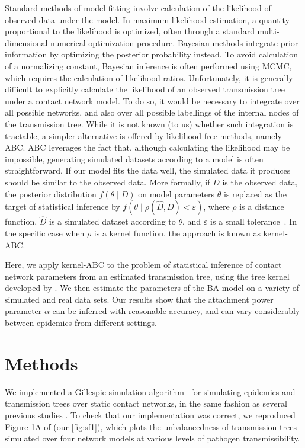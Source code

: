 \documentclass[12pt]{article}\usepackage[]{graphicx}\usepackage[]{color}
\begin{document}
Standard methods of model fitting involve calculation of the likelihood of
observed data under the model. In maximum likelihood estimation, a quantity
proportional to the likelihood is optimized, often through a standard
multi-dimensional numerical optimization procedure. Bayesian methods integrate
prior information by optimizing the posterior probability instead. To avoid
calculation of a normalizing constant, Bayesian inference is often performed
using \gls{MCMC}, which requires the calculation of likelihood ratios.
Unfortunately, it is generally difficult to explicitly calculate the likelihood
of an observed transmission tree under a contact network model. To do so, it
would be necessary to integrate over all possible networks, and also over all
possible labellings of the internal nodes of the transmission tree. While it is
not known (to us) whether such integration is tractable, a simpler alternative
is offered by likelihood-free methods, namely \gls{ABC}. \gls{ABC} leverages
the fact that, although calculating the likelihood may be impossible,
generating simulated datasets according to a model is often straightforward. If
our model fits the data well, the simulated data it produces should be similar
to the observed data. More formally, if $D$ is the observed data, the posterior
distribution $f(\theta \mid D)$ on model parameters $\theta$ is replaced as the
target of statistical inference by $f(\theta \mid \rho(\hat{D}, D) <
\varepsilon)$, where $\rho$ is a distance function, $\hat{D}$ is a simulated
dataset according to $\theta$, and $\varepsilon$ is a small
tolerance~\autocite{sunnaker2013approximate}. In the specific case when $\rho$
is a kernel function, the approach is known as kernel-\gls{ABC}.

Here, we apply kernel-\gls{ABC} to the problem of statistical inference of
contact network parameters from an estimated transmission tree, using the tree
kernel developed by \textcite{poon2013mapping}. We then estimate the parameters
of the \gls{BA} model on a variety of simulated and real data sets. Our results
show that the attachment power parameter $\alpha$ can be inferred with
reasonable accuracy, and can vary considerably between epidemics from different
settings.

\section*{Methods}

We implemented a Gillespie simulation algorithm~\autocite{gillespie1976general}
for simulating epidemics and transmission trees over static contact networks,
in the same fashion as several previous studies
\autocite[\textit{e.g.}][]{o2010contact, robinson2013dynamics,
leventhal2012inferring, groendyke2011bayesian, goodreau2006assessing}. To check
that our implementation was correct, we reproduced Figure 1A of
\textcite{leventhal2012inferring} (our \cref{fig:sf1}), which plots the
unbalancedness of transmission trees simulated over four network models at
various levels of pathogen transmissibility.
\end{document}
